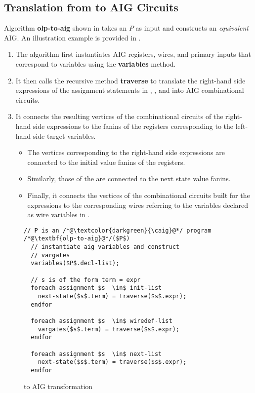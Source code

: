 \subsection{Translation from \caig to AIG Circuits}
%
Algorithm {\bf olp-to-aig} shown in   
takes an \caig $P$ as input and constructs an {\em equivalent}
AIG. An illustration example is provided in  
.
%
\begin{enumerate}
  \item The algorithm first instantiates AIG 
registers, wires, and primary
inputs that correspond to \caig variables 
using the {\bf variables} method. 

\item It then calls the recursive method {\bf traverse} 
  to translate the right-hand side expressions 
of the assignment statements in 
    , ,
and  into AIG combinational circuits. 
\item It connects the resulting vertices of the combinational 
circuits of the right-hand side expressions to the fanins of the registers corresponding to the left-hand side target variables. 
    \begin{itemize}
\item The vertices corresponding to the  
  right-hand side expressions are connected to the  
  initial value fanins of the registers. 
\item Similarly, those of the  are connected to 
  the next state value fanins. 
\item Finally, it connects the vertices of the combinational 
  circuits built for the  expressions to 
  the corresponding wires referring to the 
  variables declared as wire variables in .
    \end{itemize}
\end{enumerate}
\begin{figure}
\begin{lstlisting}
// P is an /*@\textcolor{darkgreen}{\caig}@*/ program
/*@\textbf{olp-to-aig}@*/($P$) 
  // instantiate aig variables and construct
  // vargates
  variables($P$.decl-list); 
  
  // s is of the form term = expr 
  foreach assignment $s  \in$ init-list 
    next-state($s$.term) = traverse($s$.expr);  
  endfor
  
  foreach assignment $s  \in$ wiredef-list
    vargates($s$.term) = traverse($s$.expr);  
  endfor
  
  foreach assignment $s  \in$ next-list
    next-state($s$.term) = traverse($s$.expr);  
  endfor
\end{lstlisting}
\vspace*{-1em}
\caption{\caig to AIG transformation }
\label{fig:olp2aig}
\end{figure}
%
